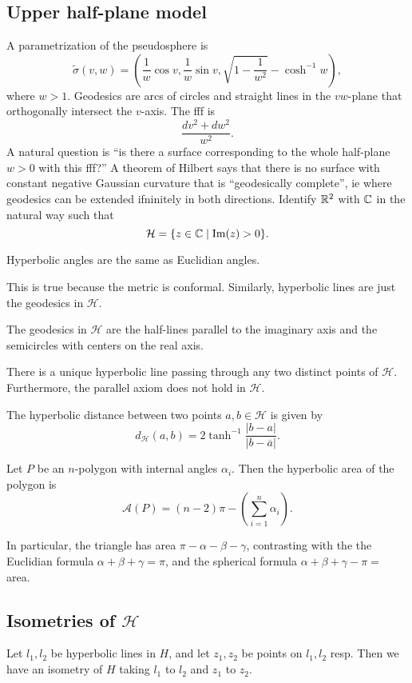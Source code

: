 \subsection{Upper half-plane model}
A parametrization of the pseudosphere is \[
    \widetilde \sigma(v,w)= \left( \frac{1}{w}\cos v, \frac{1}{w} \sin v, \sqrt{1- \frac{1}{w^2}} - \cosh ^{-1} w \right) ,
\] where $w>1$. Geodesics are arcs of circles and straight lines in the $vw$-plane that orthogonally intersect the $v$-axis. The fff is \[
\frac{dv^2+dw^2}{w^2 }.
\] A natural question is ``is there a surface corresponding to the whole half-plane $w>0$ with this fff?'' A theorem of Hilbert says that there is no surface with constant negative Gaussian curvature that is ``geodesically complete'', ie where geodesics can be extended ifninitely in both directions. Identify $\mathbb{R}^2$ with $\mathbb{C}$ in the natural way such that \[
\mathcal{H} = \{z \in \mathbb{C} \mid \operatorname{Im}(z)>0\} .
\] 
\begin{prop}
    Hyperbolic angles are the same as Euclidian angles.
\end{prop}This is true because the metric is conformal. Similarly, hyperbolic lines are just the geodesics in $\mathcal{H} $.
\begin{prop}
    The geodesics in $\mathcal{H} $ are the half-lines parallel to the imaginary axis and the semicircles with centers on the real axis.
\end{prop}
\begin{prop}
    There is a unique hyperbolic line passing through any two distinct points of $\mathcal{H} $. Furthermore, the parallel axiom does not hold in $\mathcal{H} $.
\end{prop}
\begin{prop}
    The hyperbolic distance between two points $a,b \in \mathcal{H} $ is given by \[
        d _{\mathcal{H} }(a,b) = 2 \tanh ^{-1} \frac{|b-a|}{|b-\overline{a}|}.
    \] 
\end{prop}
\begin{theorem}
    Let $P$ be an $n$-polygon with internal angles $\alpha _i $. Then the hyperbolic area of the polygon is \[
        \mathcal{A} (P)= (n-2)\pi- \left(\sum_{i=1}^n   \alpha _i \right).
    \] 
\end{theorem}
In particular, the triangle has area $\pi-\alpha -\beta -\gamma $, contrasting with the the Euclidian formula $\alpha +\beta +\gamma =\pi$, and the spherical formula $\alpha +\beta +\gamma -\pi=$ area.

\subsection{Isometries of $\mathcal{H} $}
\begin{prop}
    Let $l_1,l_2$ be hyperbolic lines in $H$, and let $z_1,z_2$ be points on $l_1,l_2$ resp. Then we have an isometry of $H$ taking $l_1$ to $l_2$ and $z_1$ to $z_2$.
\end{prop}

